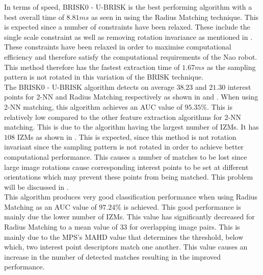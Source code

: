\documentclass[11pt]{report}
\begin{document}
In terms of speed, BRISK0 - U-BRISK is the best performing algorithm with a best overall time of $8.81 ms$ as seen in  using the Radius Matching technique.  This is expected since a number of constraints have been relaxed. These include the single scale constraint as well as removing rotation invariance as mentioned in . These constraints have been relaxed in order to maximise computational efficiency and therefore satisfy the computational requirements of the Nao robot. This method therefore has the fastest extraction time of $1.67 ms$ as the sampling pattern is not rotated in this variation of the BRISK technique. \\

The BRISK0 - U-BRISK algorithm detects on average $38.23$ and $21.30$ interest points for 2-NN and Radius Matching respectively as shown in  and . When using 2-NN matching, this algorithm achieves an AUC value of $95.35\%$. This is relatively low compared to the other feature extraction algorithms for 2-NN matching. This is due to the algorithm having the largest number of IZMs. It has $108$ IZMs as shown in . This is expected, since this method is not rotation invariant since the sampling pattern is not rotated in order to achieve better computational performance. This causes a number of matches to be lost since large image rotations cause corresponding interest points to be set at different orientations which may prevent these points from being matched. This problem will be discussed in .\\

This algorithm produces very good classification performance when using Radius Matching as an AUC value of $97.24\%$ is achieved. This good performance is mainly due the lower number of IZMs. This value has significantly decreased for Radius Matching to a mean value of $33$ for overlapping image pairs. This is mainly due to the MPS's MAHD value that determines the threshold, below which, two interest point descriptors match one another. This value causes an increase in the number of detected matches resulting in the improved performance.\\
\end{document}
